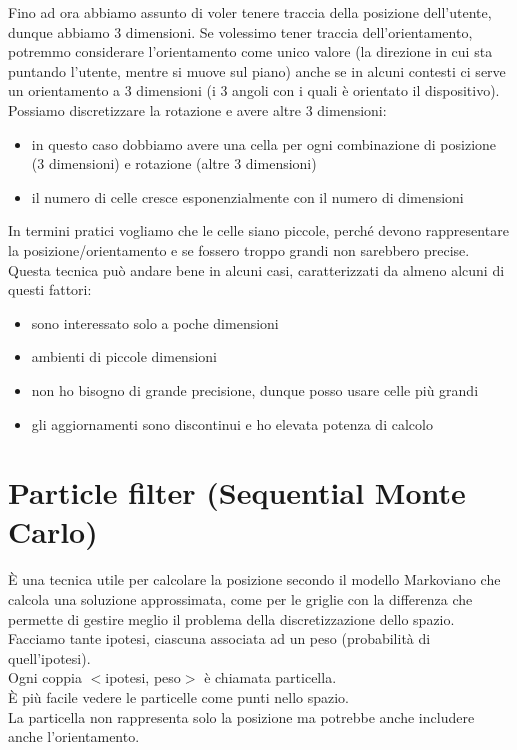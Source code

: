 Fino ad ora abbiamo assunto di voler tenere traccia della posizione dell'utente, dunque abbiamo 3 dimensioni. 
Se volessimo tener traccia dell'orientamento, potremmo considerare l'orientamento come unico valore (la direzione in cui sta puntando l'utente, mentre si muove sul piano) anche se in alcuni contesti ci serve un orientamento a 3 dimensioni (i 3 angoli con i quali è orientato il dispositivo).
Possiamo discretizzare la rotazione e avere altre 3 dimensioni:
\begin{itemize}
    \item in questo caso dobbiamo avere una cella per ogni combinazione di posizione (3 dimensioni) e rotazione (altre 3 dimensioni)
    \item il numero di celle cresce esponenzialmente con il numero di dimensioni
\end{itemize}

In termini pratici vogliamo che le celle siano piccole, perché devono rappresentare la posizione/orientamento e se fossero troppo grandi non sarebbero precise. 
\\ Questa tecnica può andare bene in alcuni casi, caratterizzati da almeno alcuni di questi fattori:
\begin{itemize}
    \item sono interessato solo a poche dimensioni
    \item ambienti di piccole dimensioni
    \item non ho bisogno di grande precisione, dunque posso usare celle più grandi
    \item gli aggiornamenti sono discontinui e ho elevata potenza di calcolo
\end{itemize}

\section{Particle filter (Sequential Monte Carlo)}
È una tecnica utile per calcolare la posizione secondo il modello Markoviano che calcola una soluzione approssimata, come per le griglie con la differenza che permette di gestire meglio il problema della discretizzazione dello spazio. 
\\ Facciamo tante ipotesi, ciascuna associata ad un peso (probabilità di quell'ipotesi). 
\\ Ogni coppia $<$ipotesi, peso$>$ è chiamata particella. 
\\ È più facile vedere le particelle come punti nello spazio.
\\ La particella non rappresenta solo la posizione ma potrebbe anche includere anche l'orientamento.

